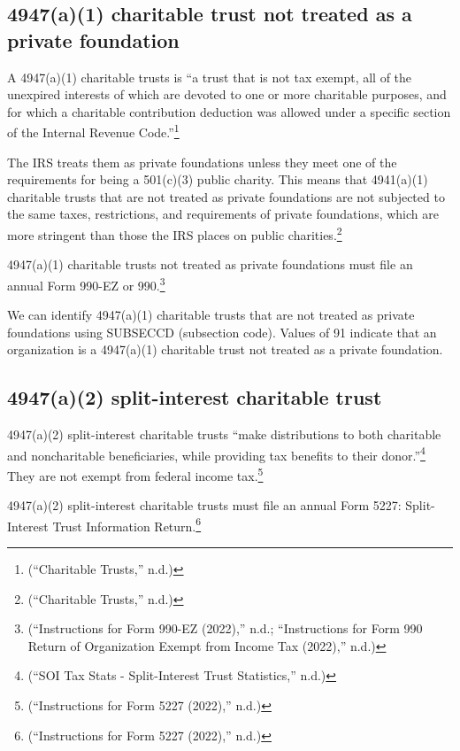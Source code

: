 \documentclass[
  letterpaper,
  DIV=11,
  numbers=noendperiod]{scrreprt}
\begin{document}
\hypertarget{a1-charitable-trust-not-treated-as-a-private-foundation}{%
\subsection{4947(a)(1) charitable trust not treated as a private
foundation}\label{a1-charitable-trust-not-treated-as-a-private-foundation}}

A 4947(a)(1) charitable trusts is ``a trust that is not tax exempt, all
of the unexpired interests of which are devoted to one or more
charitable purposes, and for which a charitable contribution deduction
was allowed under a specific section of the Internal Revenue
Code.''\footnote{({``Charitable Trusts,''} n.d.)}

The IRS treats them as private foundations unless they meet one of the
requirements for being a 501(c)(3) public charity. This means that
4941(a)(1) charitable trusts that are not treated as private foundations
are not subjected to the same taxes, restrictions, and requirements of
private foundations, which are more stringent than those the IRS places
on public charities.\footnote{({``Charitable Trusts,''} n.d.)}

4947(a)(1) charitable trusts not treated as private foundations must
file an annual Form 990-EZ or 990.\footnote{({``Instructions for Form
  990-EZ (2022),''} n.d.; {``Instructions for Form 990 Return of
  Organization Exempt from Income Tax (2022),''} n.d.)}

We can identify 4947(a)(1) charitable trusts that are not treated as
private foundations using SUBSECCD (subsection code). Values of 91
indicate that an organization is a 4947(a)(1) charitable trust not
treated as a private foundation.

\hypertarget{a2-split-interest-charitable-trust}{%
\subsection{4947(a)(2) split-interest charitable
trust}\label{a2-split-interest-charitable-trust}}

4947(a)(2) split-interest charitable trusts ``make distributions to both
charitable and noncharitable beneficiaries, while providing tax benefits
to their donor.''\footnote{({``SOI Tax Stats - Split-Interest Trust
  Statistics,''} n.d.)} They are not exempt from federal income
tax.\footnote{({``Instructions for Form 5227 (2022),''} n.d.)}

4947(a)(2) split-interest charitable trusts must file an annual Form
5227: Split-Interest Trust Information Return.\footnote{({``Instructions
  for Form 5227 (2022),''} n.d.)}
\end{document}
